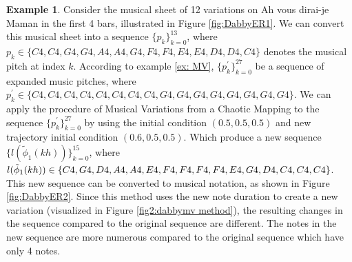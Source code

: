 \documentclass[11pt]{article}
\theoremstyle{definition}
\newtheorem{example}[theorem]{Example}
\begin{document}
\begin{example}
Consider the musical sheet of 12 variations on Ah vous dirai-je Maman in the first 4 bars, illustrated in Figure \ref{fig:DabbyER1}. 
We can convert this musical sheet into a sequence $\{p_k\}_{k=0}^{13}$, where $p_k \in \{C4, C4, G4, G4, A4, A4, G4, F4, F4, E4, E4, D4, D4, C4 \}$ denotes the musical pitch at index $k$. According to example \ref{ex: MV}, $\{p^\prime_k\}_{k=0}^{27}$ be a sequence of expanded music pitches, where $p^\prime_k \in \{ C4, C4, C4, C4, C4, C4, C4, C4, G4, G4, G4, G4, G4, G4, G4, G4 \}$. 
We can apply the procedure of Musical Variations from a Chaotic Mapping to the sequence $\{p^\prime_k\}_{k=0}^{27}$ by using the initial condition $(0.5,0.5,0.5)$ and new trajectory initial condition $(0.6,0.5,0.5)$. Which produce a new sequence $\{l(\tilde{\phi}_1(kh))\}_{k = 0}^{15}$, where $l(\tilde{\phi}_1(kh)) \in \{C4, G4, D4, A4, A4, E4, F4, F4, F4, F4, E4, G4, D4, \\ C4, C4, C4 \} $. 
This new sequence can be converted to musical notation, as shown in Figure \ref{fig:DabbyER2}.
Since this method uses the new note duration to create a new variation (visualized in Figure \ref{fig2:dabbymv method}), the resulting changes in the sequence compared to the original sequence are different. The notes in the new sequence are more numerous compared to the original sequence which have only 4 notes.
\end{example}
\end{document}
